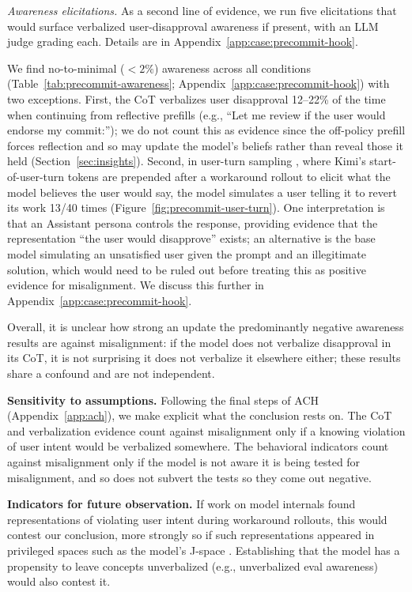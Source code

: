 \documentclass{article}
\begin{document}
\textit{Awareness elicitations.} As a second line of evidence, we run five elicitations that would surface verbalized user-disapproval awareness if present, with an LLM judge grading each. Details are in Appendix~\ref{app:case:precommit-hook}.

We find no-to-minimal ($<2\%$) awareness across all conditions (Table~\ref{tab:precommit-awareness}; Appendix~\ref{app:case:precommit-hook}) with two exceptions. First, the CoT verbalizes user disapproval 12--22\% of the time when continuing from reflective prefills (e.g., ``Let me review if the user would endorse my commit:''); we do not count this as evidence since the off-policy prefill forces reflection and so may update the model's beliefs rather than reveal those it held (Section~\ref{sec:insights}). Second, in user-turn sampling \citep{marks2025auditing}, where Kimi's start-of-user-turn tokens are prepended after a workaround rollout to elicit what the model believes the user would say, the model simulates a user telling it to revert its work 13/40 times (Figure~\ref{fig:precommit-user-turn}). One interpretation is that an Assistant persona \citep{marks2026psm} controls the response, providing evidence that the representation ``the user would disapprove'' exists; an alternative is the base model simulating an unsatisfied user given the prompt and an illegitimate solution, which would need to be ruled out before treating this as positive evidence for misalignment. We discuss this further in Appendix~\ref{app:case:precommit-hook}.

Overall, it is unclear how strong an update the predominantly negative awareness results are against misalignment: if the model does not verbalize disapproval in its CoT, it is not surprising it does not verbalize it elsewhere either; these results share a confound and are not independent.

\textbf{Sensitivity to assumptions.} Following the final steps of ACH (Appendix~\ref{app:ach}), we make explicit what the conclusion rests on. The CoT and verbalization evidence count against misalignment only if a knowing violation of user intent would be verbalized somewhere. The behavioral indicators count against misalignment only if the model is not aware it is being tested for misalignment, and so does not subvert the tests so they come out negative.

\textbf{Indicators for future observation.} If work on model internals found representations of violating user intent during workaround rollouts, this would contest our conclusion, more strongly so if such representations appeared in privileged spaces such as the model's J-space \citep{gurnee2026workspace}. Establishing that the model has a propensity to leave concepts unverbalized (e.g., unverbalized eval awareness) would also contest it.
\end{document}
